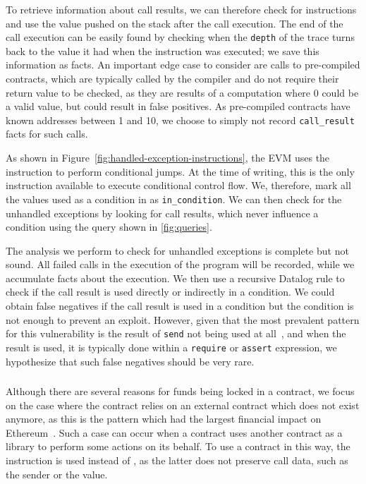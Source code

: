 To retrieve information about call results, we can therefore check for  instructions and use the value pushed on the stack after the call execution. The end of the call execution can be easily found by checking when the \lstinline{depth} of the trace turns back to the value it had when the  instruction was executed; we save this information as  facts.
An important edge case to consider are calls to pre-compiled contracts, which are typically called by the compiler and do not require their return value to be checked, as they are results of a computation where $0$ could be a valid value, but could result in false positives.
As pre-compiled contracts have known addresses between 1 and 10, we choose to simply not record \lstinline{call_result} facts for such calls.

As shown in Figure~\ref{fig:handled-exception-instructions}, the EVM uses the  instruction to perform conditional jumps. At the time of writing, this is the only instruction available to execute conditional control flow. We, therefore, mark all the values used as a condition in  as \lstinline{in_condition}. We can then check for the unhandled exceptions by looking for call results, which never influence a condition using the query shown in \autoref{fig:queries}.

\correctness The analysis we perform to check for unhandled exceptions is complete but not sound.
All failed calls in the execution of the program will be recorded, while we accumulate facts about the execution.
We then use a recursive Datalog rule to check if the call result is used directly or indirectly in a condition.
We could obtain false negatives if the call result is used in a condition but the condition is not enough to prevent an exploit.
However, given that the most prevalent pattern for this vulnerability is the result of \lstinline{send} not being used at all~\cite{Tsankov2018}, and when the result is used, it is typically done within a \lstinline{require} or \lstinline{assert} expression, we hypothesize that such false negatives should be very rare.

\subsubsection{\lockedether}
Although there are several reasons for funds being locked in a contract, we focus on the case where the contract relies on an external contract which does not exist anymore, as this is the pattern which had the largest financial impact on Ethereum~\cite{Breidenbach}. Such a case can occur when a contract uses another contract as a library to perform some actions on its behalf. To use a contract in this way, the  instruction is used instead of , as the latter does not preserve call data, such as the sender or the value.


